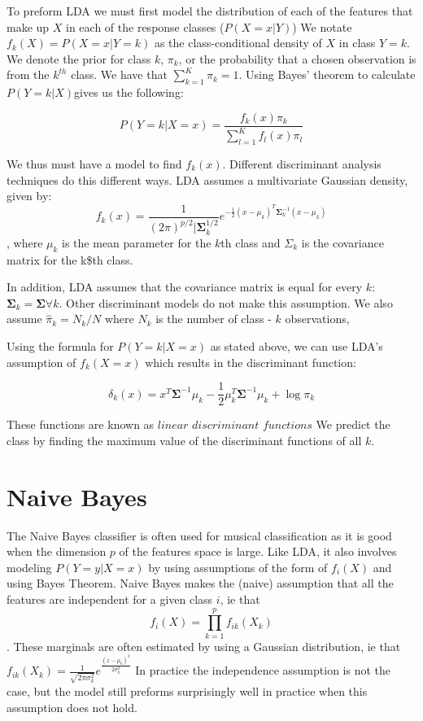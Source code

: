 \documentclass[12pt,twoside]{reedthesis}
\theoremstyle{definition}
\theoremstyle{definition}
\theoremstyle{definition}
\theoremstyle{remark}
\begin{document}
To preform LDA we must first model the distribution of each of the
features that make up \(X\) in each of the response classes
(\(P(X = x|Y)\)) We notate \(f_k(X) = P(X = x| Y = k)\) as the
class-conditional density of \(X\) in class \(Y = k\). We denote the
prior for class \(k\), \(\pi_k\), or the probability that a chosen
observation is from the \(k^{th}\) class. We have that
\(\sum_{k=1}^K \pi_k = 1\). Using Bayes' theorem to calculate
\(P(Y = k |X)\)gives us the following:

\[ P(Y = k | X = x) = \frac{f_k(x)\pi_k}{\sum_{l = 1}^Kf_l(x)\pi_l}\]

We thus must have a model to find \(f_k(x)\). Different discriminant
analysis techniques do this different ways. LDA assumes a multivariate
Gaussian density, given by:
\[f_k(x) = \frac{1}{(2\pi)^{p/2}|\mathbf{\Sigma}_k^{1/2}}e^{-\frac{1}{2}(x-\mu_k)^T\mathbf{\Sigma}_k^{-1}(x - \mu_k)}\]
, where \(\mu_k\) is the mean parameter for the \(k\)th class and
\(\Sigma_k\) is the covariance matrix for the k\$th class.

In addition, LDA assumes that the covariance matrix is equal for every
\(k\): \(\mathbf{\Sigma}_k = \mathbf{\Sigma} \forall k\). Other
discriminant models do not make this assumption. We also assume
\(\hat{\pi}_k = N_k/N\) where \(N_k\) is the number of class - \(k\)
observations,

Using the formula for \(P(Y = k|X=x)\) as stated above, we can use LDA's
assumption of \(f_k(X = x)\) which results in the discriminant function:

\[ \delta_k(x) = x^T\mathbf{\Sigma}^{-1}\mu_k - \frac{1}{2}\mu_k^T\mathbf{\Sigma}^{-1}\mu_k + \log \pi_k \]

These functions are known as \(\textit{linear discriminant functions}\)
We predict the class by finding the maximum value of the discriminant
functions of all \(k\).

\section{Naive Bayes}\label{naive-bayes}

The Naive Bayes classifier is often used for musical classification as
it is good when the dimension \(p\) of the features space is large. Like
LDA, it also involves modeling \(P(Y = y | X =x)\) by using assumptions
of the form of \(f_i(X)\) and using Bayes Theorem. Naive Bayes makes the
(naive) assumption that all the features are independent for a given
class \(i\), ie that \[f_i(X) = \prod_{k = 1}^p f_{ik}(X_k)\]. These
marginals are often estimated by using a Gaussian distribution, ie that
\(f_{ik}(X_k) = \frac{1}{\sqrt{2\pi\sigma_k^2}}e^{\frac{(x - \mu_k)^2}{2\sigma_k^2}}\)
In practice the independence assumption is not the case, but the model
still preforms surprisingly well in practice when this assumption does
not hold.
\end{document}
